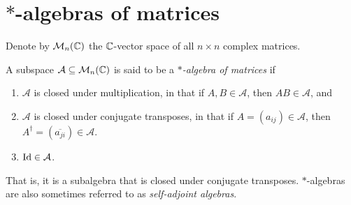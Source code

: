 

\clearpage
\section{$*$-algebras of matrices}

	Denote by $\mathcal{M}_n(\mathbb{C})$ the $\mathbb{C}$-vector space of all $n \times n$ complex matrices.

	\begin{fdef}
		A subspace $\mathcal{A} \subseteq \mathcal{M}_n(\mathbb{C})$ is said to be a \emph{$*$-algebra of matrices} if
		\begin{enumerate}[label=(\alph*)]
			\item $\mathcal{A}$ is closed under multiplication, in that if $A,B \in \mathcal{A}$, then $AB \in \mathcal{A}$, and
			\item $\mathcal{A}$ is closed under conjugate transposes, in that if $A = (a_{ij}) \in \mathcal{A}$, then $A^\dagger = (\overline{a_{ji}}) \in \mathcal{A}$.
			\item $\operatorname{Id} \in \mathcal{A}$.
		\end{enumerate}
	\end{fdef}

	That is, it is a subalgebra that is closed under conjugate transposes. $*$-algebras are also sometimes referred to as \emph{self-adjoint algebras}.\\

